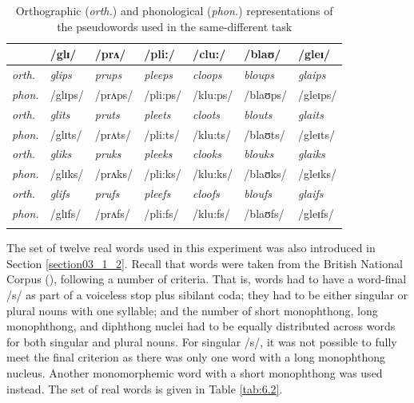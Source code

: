 \begin{table}\fontsize{10}{11}
\caption{Orthographic (\textit{orth.}) and phonological (\textit{phon.}) representations of the pseudowords used in the same-different task}
\label{tab:6.1}
\centering
\begin{tabular}{lllllll} 
\lsptoprule
~              & /glɪ/          & /prʌ/          & /pli:/          & /clu:/          & /blaʊ/          & /gleɪ/           \\ 
\midrule
\textit{orth.} & \textit{glips} & \textit{prups} & \textit{pleeps} & \textit{cloops} & \textit{bloups} & \textit{glaips}  \\
\textit{phon.} & /glɪps/        & /prʌps/        & /pli:ps/        & /klu:ps/        & /blaʊps/        & /gleɪps/         \\ 
\midrule
\textit{orth.} & \textit{glits} & \textit{pruts} & \textit{pleets} & \textit{cloots} & \textit{blouts} & \textit{glaits}  \\
\textit{phon.} & /glɪts/        & /prʌts/        & /pli:ts/        & /klu:ts/        & /blaʊts/        & /gleɪts/         \\ 
\midrule
\textit{orth.} & \textit{gliks} & \textit{pruks} & \textit{pleeks} & \textit{clooks} & \textit{blouks} & \textit{glaiks}  \\
\textit{phon.} & /glɪks/        & /prʌks/        & /pli:ks/        & /klu:ks/        & /blaʊks/        & /gleɪks/         \\ 
\midrule
\textit{orth.} & \textit{glifs} & \textit{prufs} & \textit{pleefs} & \textit{cloofs} & \textit{bloufs} & \textit{glaifs}  \\
\textit{phon.} & /glɪfs/        & /prʌfs/        & /pli:fs/        & /klu:fs/        & /blaʊfs/        & /gleɪfs/         \\
\lspbottomrule
\end{tabular}
\end{table}

The set of twelve real words used in this experiment was also introduced in Section \ref{section03_1_2}. Recall that words were taken from the British National Corpus (\cite{Davies2004}), following a number of criteria. That is, words had to have a word-final /s/ as part of a voiceless stop plus sibilant coda; they had to be either singular or plural nouns with one syllable; and the number of short monophthong, long monophthong, and diphthong nuclei had to be equally distributed across words for both singular and plural nouns. For singular /s/, it was not possible to fully meet the final criterion as there was only one word with a long monophthong nucleus. Another monomorphemic word with a short monophthong was used instead. The set of real words is given in Table \ref{tab:6.2}.

